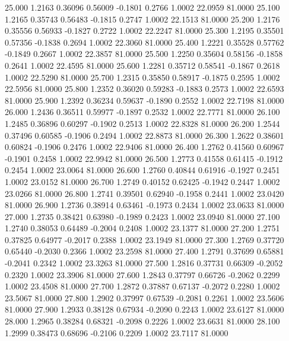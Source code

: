   25.000   1.2163   0.36096   0.56009  -0.1801   0.2766   1.0002  22.0959  81.0000
  25.100   1.2165   0.35743   0.56483  -0.1815   0.2747   1.0002  22.1513  81.0000
  25.200   1.2176   0.35556   0.56933  -0.1827   0.2722   1.0002  22.2247  81.0000
  25.300   1.2195   0.35501   0.57356  -0.1838   0.2694   1.0002  22.3060  81.0000
  25.400   1.2221   0.35528   0.57762  -0.1849   0.2667   1.0002  22.3857  81.0000
  25.500   1.2250   0.35604   0.58156  -0.1858   0.2641   1.0002  22.4595  81.0000
  25.600   1.2281   0.35712   0.58541  -0.1867   0.2618   1.0002  22.5290  81.0000
  25.700   1.2315   0.35850   0.58917  -0.1875   0.2595   1.0002  22.5956  81.0000
  25.800   1.2352   0.36020   0.59283  -0.1883   0.2573   1.0002  22.6593  81.0000
  25.900   1.2392   0.36234   0.59637  -0.1890   0.2552   1.0002  22.7198  81.0000
  26.000   1.2436   0.36511   0.59977  -0.1897   0.2532   1.0002  22.7771  81.0000
  26.100   1.2485   0.36896   0.60297  -0.1902   0.2513   1.0002  22.8328  81.0000
  26.200   1.2544   0.37496   0.60585  -0.1906   0.2494   1.0002  22.8873  81.0000
  26.300   1.2622   0.38601   0.60824  -0.1906   0.2476   1.0002  22.9406  81.0000
  26.400   1.2762   0.41560   0.60967  -0.1901   0.2458   1.0002  22.9942  81.0000
  26.500   1.2773   0.41558   0.61415  -0.1912   0.2454   1.0002  23.0064  81.0000
  26.600   1.2760   0.40844   0.61916  -0.1927   0.2451   1.0002  23.0152  81.0000
  26.700   1.2749   0.40152   0.62425  -0.1942   0.2447   1.0002  23.0266  81.0000
  26.800   1.2741   0.39501   0.62940  -0.1958   0.2441   1.0002  23.0420  81.0000
  26.900   1.2736   0.38914   0.63461  -0.1973   0.2434   1.0002  23.0633  81.0000
  27.000   1.2735   0.38421   0.63980  -0.1989   0.2423   1.0002  23.0940  81.0000
  27.100   1.2740   0.38053   0.64489  -0.2004   0.2408   1.0002  23.1377  81.0000
  27.200   1.2751   0.37825   0.64977  -0.2017   0.2388   1.0002  23.1949  81.0000
  27.300   1.2769   0.37720   0.65440  -0.2030   0.2366   1.0002  23.2598  81.0000
  27.400   1.2791   0.37699   0.65881  -0.2041   0.2342   1.0002  23.3263  81.0000
  27.500   1.2816   0.37731   0.66309  -0.2052   0.2320   1.0002  23.3906  81.0000
  27.600   1.2843   0.37797   0.66726  -0.2062   0.2299   1.0002  23.4508  81.0000
  27.700   1.2872   0.37887   0.67137  -0.2072   0.2280   1.0002  23.5067  81.0000
  27.800   1.2902   0.37997   0.67539  -0.2081   0.2261   1.0002  23.5606  81.0000
  27.900   1.2933   0.38128   0.67934  -0.2090   0.2243   1.0002  23.6127  81.0000
  28.000   1.2965   0.38284   0.68321  -0.2098   0.2226   1.0002  23.6631  81.0000
  28.100   1.2999   0.38473   0.68696  -0.2106   0.2209   1.0002  23.7117  81.0000
